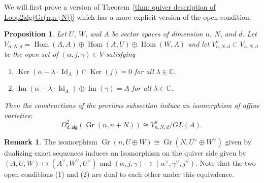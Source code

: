\documentclass{amsart}
\newtheorem{proposition}[theorem]{Proposition}
\theoremstyle{definition}
\newtheorem{remark}[theorem]{Remark}
\newcommand{\CC} {{\mathbb C}}          %
\newcommand{\Hom}{\operatorname{Hom}}
\newcommand{\Ker}{\operatorname{Ker}}
\newcommand{\im}{\operatorname{Im}}
\newcommand{\alg}{\mathsf{alg}}
\newcommand{\Gr}{\operatorname{Gr}}
\newcommand{\LoopTwo}{\Omega^{2}_{d,\alg}}
\newcommand{\Id}{\operatorname{Id}}
\begin{document}
We will first prove a version of Theorem~\ref{thm: quiver description
of Loop2alg(Gr(n,n+N))} which has a more explicit version of the open
condition. 

\begin{proposition}\label{prop: quiver description of Loop2(Gr(n,n+N))
with explicit stability condition}
Let $U$, $W$, and $A$ be vector spaces of dimension $n$, $N$, and
$d$. Let $V_{n,N,d} = \Hom (A,A)\oplus \Hom (A,U)\oplus \Hom (W,A)$ and let
$V^{o}_{n,N,d}\subset V_{n,N,d}$ be the open set of $(\alpha ,j,\gamma )\in V$
satisfying
\begin{enumerate}
\item $\Ker (\alpha -\lambda \cdot \Id_{A})\cap \Ker (j) = 0$ for all
$\lambda\in \CC $.
\item  $\im (\alpha -\lambda \cdot \Id_{A})\oplus  \im (\gamma )=A$ for
all $\lambda\in \CC $.
\end{enumerate}
Then the constructions of the previous subsection induce an
isomorphism of affine varieties:
\[
\LoopTwo (\Gr (n,n+N))\cong V^{o}_{n,N,d}/GL(A) .
\]
\end{proposition}

\begin{comment}
\begin{remark}\label{rem: Gr(n,n+N) is a model for BGL(n) and Vo/GL(A) is a model for BGL(d)}
The Grassmannian on the left is an approximate model for $BGL(n)$ and
the quotient on the right is an approximate model for $BGL(d)$. We can
thus regard our theorem as saying, in a sense that we will make
precise in the next subsection, that there is an approximate
equivalence $\Omega^{2}(BGL(n))\sim BGL(d)$.
\end{remark}
\end{comment}


\begin{remark}\label{rem: duality induced by Gr(n,n+N)=Gr(N,n+N)}
The isomorphism $\Gr (n,U\oplus W)\cong \Gr (N,U^{\vee}\oplus
W^{\vee})$ given by dualizing exact sequences induces an isomorphism
on the quiver side given by $(A,U,W)\mapsto
(A^{\vee},W^{\vee},U^{\vee})$ and $(\alpha ,j,\gamma )\mapsto
(\alpha^{\vee},\gamma^{\vee},j^{\vee})$. Note that the two open
conditions (1) and (2) are dual to each other under this equivalence. 
\end{remark}
\end{document}
